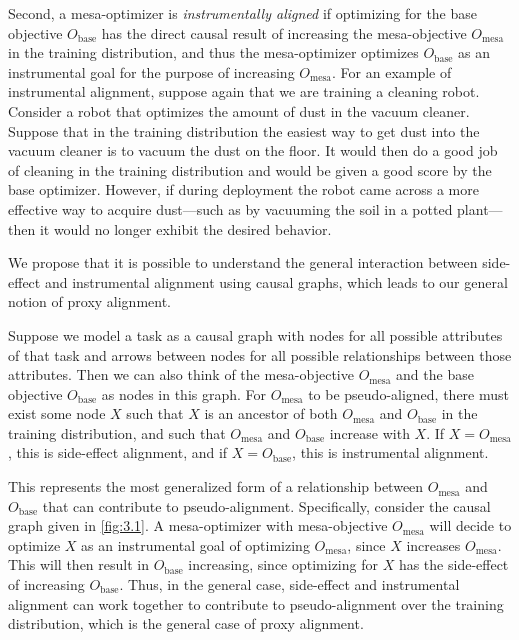 \documentclass[
  onecolumn,
  natbib,
]{miri-tech-article}
\begin{document}
Second, a mesa-optimizer is \textit{instrumentally aligned} if optimizing for the base objective $O_\text{base}$ has the direct causal result of increasing the mesa-objective $O_\text{mesa}$ in the training distribution, and thus the mesa-optimizer optimizes $O_\text{base}$ as an instrumental goal for the purpose of increasing $O_\text{mesa}$. For an example of instrumental alignment, suppose again that we are training a cleaning robot. Consider a robot that optimizes the amount of dust in the vacuum cleaner. Suppose that in the training distribution the easiest way to get dust into the vacuum cleaner is to vacuum the dust on the floor. It would then do a good job of cleaning in the training distribution and would be given a good score by the base optimizer. However, if during deployment the robot came across a more effective way to acquire dust---such as by vacuuming the soil in a potted plant---then it would no longer exhibit the desired behavior.

We propose that it is possible to understand the general interaction between side-effect and instrumental alignment using causal graphs, which leads to our general notion of proxy alignment.

Suppose we model a task as a causal graph with nodes for all possible attributes of that task and arrows between nodes for all possible relationships between those attributes. Then we can also think of the mesa-objective $O_\text{mesa}$ and the base objective $O_\text{base}$ as nodes in this graph. For $O_\text{mesa}$ to be pseudo-aligned, there must exist some node $X$ such that $X$ is an ancestor of both $O_\text{mesa}$ and $O_\text{base}$ in the training distribution, and such that $O_\text{mesa}$ and $O_\text{base}$ increase with $X$. If $X = O_\text{mesa}$, this is side-effect alignment, and if $X = O_\text{base}$, this is instrumental alignment.

This represents the most generalized form of a relationship between $O_\text{mesa}$ and $O_\text{base}$ that can contribute to pseudo-alignment. Specifically, consider the causal graph given in \cref{fig:3.1}. A mesa-optimizer with mesa-objective $O_\text{mesa}$ will decide to optimize $X$ as an instrumental goal of optimizing $O_\text{mesa}$, since $X$ increases $O_\text{mesa}$. This will then result in $O_\text{base}$ increasing, since optimizing for $X$ has the side-effect of increasing $O_\text{base}$. Thus, in the general case, side-effect and instrumental alignment can work together to contribute to pseudo-alignment over the training distribution, which is the general case of proxy alignment.
\end{document}

